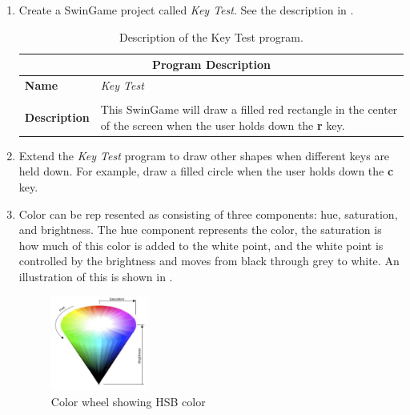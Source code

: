\begin{enumerate}
  \item Create a SwinGame project called \emph{Key Test}. See the description in .
  \begin{table}[htbp]
  \centering
  \begin{tabular}{l|p{10cm}}
    \hline
    \multicolumn{2}{c}{\textbf{Program Description}} \\
    \hline
    \textbf{Name} & \emph{Key Test} \\
    \\
    \textbf{Description} & This SwinGame will draw a filled red rectangle in the center of the screen when the user holds down the \textbf{r} key.\\
    \hline
  \end{tabular}
  \caption{Description of the Key Test program.}
  \label{tbl:key_test}
  \end{table}

  \item Extend the \emph{Key Test} program to draw other shapes when different keys are held down. For example, draw a filled circle when the user holds down the \textbf{c} key.

  
  \clearpage
  \item Color can be rep  resented as consisting of three components: hue, saturation, and brightness. The hue component represents the color, the saturation is how much of this color is added to the white point, and the white point is controlled by the brightness and moves from black through grey to white. An illustration of this is shown in .

\begin{figure}[htbp]
   \centering
   \includegraphics[width=0.3\textwidth]{./topics/control-flow/exercises/Color.png} 
   \caption{Color wheel showing HSB color}
   \label{fig:color_wheel}
\end{figure}


\end{enumerate}
